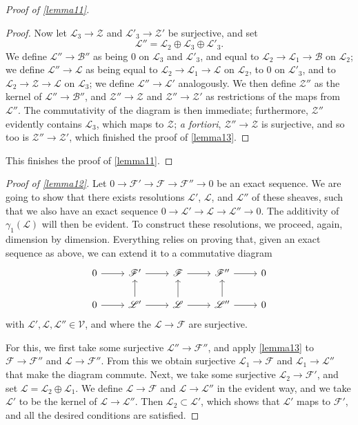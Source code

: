 \documentclass{article}
\theoremstyle{plain}
\theoremstyle{definition}
\newcommand{\sh}{\mathscr}
\newcommand{\cat}{\mathcal}
\begin{document}
\begin{proof}[Proof of \cref{lemma11}]
\begin{proof}
    Now let $\sh{L}_3\to\sh{Z}$ and $\sh{L}'_3\to\sh{Z}'$ be surjective, and set
    \[
      \sh{L}'' = \sh{L}_2\oplus\sh{L}_3\oplus\sh{L}'_3.
    \]
    We define $\sh{L}''\to\sh{B}''$ as being $0$ on $\sh{L}_3$ and $\sh{L}'_3$, and equal to $\sh{L}_2\to\sh{L}_1\to\sh{B}$ on $\sh{L}_2$;
    we define $\sh{L}''\to\sh{L}$ as being equal to $\sh{L}_2\to\sh{L}_1\to\sh{L}$ on $\sh{L}_2$, to $0$ on $\sh{L}'_3$, and to $\sh{L}_2\to\sh{Z}\to\sh{L}$ on $\sh{L}_3$;
    we define $\sh{L}''\to\sh{L}'$ analogously.
    We then define $\sh{Z}''$ as the kernel of $\sh{L}''\to\sh{B}''$, and $\sh{Z}''\to\sh{Z}$ and $\sh{Z}''\to\sh{Z}'$ as restrictions of the maps from $\sh{L}''$.
    The commutativity of the diagram is then immediate;
    furthermore, $\sh{Z}''$ evidently contains $\sh{L}_3$, which maps to $\sh{Z}$;
    \emph{a fortiori}, $\sh{Z}''\to\sh{Z}$ is surjective, and so too is $\sh{Z}''\to\sh{Z}'$, which finished the proof of \cref{lemma13}.
  \end{proof}
  This finishes the proof of \cref{lemma11}.
\end{proof}

\begin{proof}[Proof of \cref{lemma12}]
  Let $0\to\sh{F}'\to\sh{F}\to\sh{F}''\to0$ be an exact sequence.
  We are going to show that there exists resolutions $\sh{L}'$, $\sh{L}$, and $\sh{L}''$ of these sheaves, such that we also have an exact sequence $0\to\sh{L}'\to\sh{L}\to\sh{L}''\to0$.
  The additivity of $\gamma_1(\sh{L})$ will then be evident.
  To construct these resolutions, we proceed, again, dimension by dimension.
  Everything relies on proving that, given an exact sequence as above, we can extend it to a commutative diagram
  \[
    \begin{tikzcd}
      0 \rar
      & \sh{F}' \rar
      & \sh{F} \rar
      & \sh{F}'' \rar
      & 0
    \\0 \rar
      & \sh{L}' \rar\uar
      & \sh{L} \rar\uar
      & \sh{L}'' \rar\uar
      & 0
    \end{tikzcd}
  \]
  with $\sh{L}',\sh{L},\sh{L}''\in\cat{V}$, and where the $\sh{L}\to\sh{F}$ are surjective.

  For this, we first take some surjective $\sh{L}''\to\sh{F}''$, and apply \cref{lemma13} to $\sh{F}\to\sh{F}''$ and $\sh{L}\to\sh{F}''$.
  From this we obtain surjective $\sh{L}_1\to\sh{F}$ and $\sh{L}_1\to\sh{L}''$ that make the diagram commute.
  Next, we take some surjective $\sh{L}_2\to\sh{F}'$, and set $\sh{L}=\sh{L}_2\oplus\sh{L}_1$.
  We define $\sh{L}\to\sh{F}$ and $\sh{L}\to\sh{L}''$ in the evident way, and we take $\sh{L}'$ to be the kernel of $\sh{L}\to\sh{L}''$.
  Then $\sh{L}_2\subset\sh{L}'$, which shows that $\sh{L}'$ maps to $\sh{F}'$, and all the desired conditions are satisfied.
\end{proof}
\end{document}
